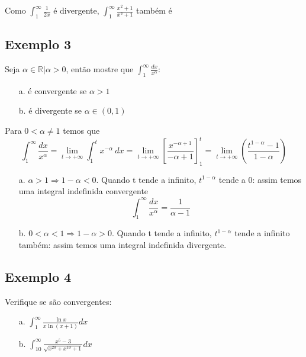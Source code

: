 \documentclass[12pt,openany]{book}
\begin{document}
Como $ \displaystyle{\int_1^{\infty} \frac{1}{2x}} $ é divergente, $\displaystyle{ \int_1^{\infty} \frac{x^2+1}{x^3+1}} $ também é

\subsection{Exemplo 3}
\label{sub:ex143}

\hspace{5mm}Seja $\alpha \in \mathds{R} | \alpha >0 $, então mostre que $\displaystyle{\int_1^\infty \frac{dx}{x^\alpha}} $:
\begin{enumerate}
\item [a.] é convergente se $\alpha > 1$\\
\item [b.] é divergente se $\alpha \in (0,1) $
\end{enumerate}

Para $0  < \alpha \neq 1$ temos que $$\displaystyle{\int_1^\infty \frac{dx}{x^\alpha} = \lim_{t \rightarrow +\infty} \int_1^t x^{-\alpha}\ dx = \lim_{t \rightarrow +\infty} \left[ \frac{x^{-\alpha + 1}}{-\alpha + 1}\right]_1^t = \lim_{t \rightarrow +\infty} \left( \frac{t^{1-\alpha}-1}{1-\alpha}\right)}$$

\begin{enumerate}
\item [a.] $\alpha > 1 \Rightarrow 1 - \alpha < 0$. Quando t tende a infinito, $t^{1-\alpha}$ tende a 0: assim temos uma integral indefinida convergente $$\displaystyle{\int_1^\infty \frac{dx}{x^\alpha}} = \frac{1}{\alpha - 1}$$
\item [b.] $0 < \alpha < 1 \Rightarrow 1 - \alpha > 0$. Quando t tende a infinito, $t^{1-\alpha}$ tende a infinito também: assim temos uma integral indefinida divergente.
\end{enumerate}

\subsection{Exemplo 4}
\label{sub:ex144}

\hspace{5mm} Verifique se são convergentes:
\begin{enumerate}
\item [a.] $\displaystyle{\int_1^{\infty} \frac{\ln x}{x \ln \left(x+1\right)} dx}$
\item [b.] $\displaystyle{\int_{10}^{\infty}\frac{x^5-3}{\sqrt{x^{20}+x^{10}+1}} dx}$
\end{enumerate}
\end{document}
